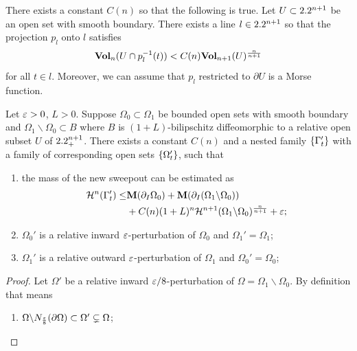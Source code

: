 \begin{theorem}[Falconer]\label{thm:falconer}
    There exists a constant $C(n)$ so that the following is true. Let $U \subset 2.2^{n + 1}$ be an open set with smooth boundary. There exists a line $l \in 2.2^{n + 1}$ so that the projection $p_l$ onto $l$ satisfies
    \begin{equation*}
        \mathbf{Vol}_n(U\cap p^{-1}_l(t)) < C(n)\mathbf{Vol}_{n + 1}(U)^{\frac{n}{n + 1}}
    \end{equation*}
    for all $t \in l$. Moreover, we can assume that $p_l$ restricted to $\partial U$ is a Morse function.
\end{theorem}
\begin{lemma}\label{lem:existence-nested-between-sets}
    Let $\varepsilon > 0$, $L > 0$. Suppose $\Omega_0 \subset \Omega_1$ be bounded open sets with smooth boundary and $\Omega_1 \backslash \Omega_0 \subset B$ where $B$ is $(1 + L)$-bilipschitz diffeomorphic to a relative open subset $U$ of $2.2^{n + 1}_+$. There exists a constant $C(n)$ and a nested family $\left\{\Gamma_t'\right\}$ with a family of corresponding open sets $\left\{\Omega_t'\right\}$, such that
    \begin{enumerate}
        \item[(1)] the mass of the new sweepout can be estimated as
        \begin{equation*}
            \begin{split}
                \mathcal{H}^n(\Gamma_t') \leq& \mathbf{M}(\partial_I\Omega_0) + \mathbf{M}(\partial_I(\Omega_1\backslash\Omega_0))\\
                &+ C(n)(1 + L)^n\mathcal{H}^{n + 1}(\Omega_1\backslash\Omega_0)^{\frac{n}{n + 1}} + \varepsilon;
            \end{split}
        \end{equation*}
        \item[(2)] $\Omega_0'$ is a relative inward $\varepsilon$-perturbation of $\Omega_0$ and $\Omega_1' = \Omega_1$;
        \item[(2')] $\Omega_1'$ is a relative outward $\varepsilon$-perturbation of $\Omega_1$ and $\Omega_0' = \Omega_0$;
    \end{enumerate}
    \begin{proof}
        Let $\Omega'$ be a relative inward $\varepsilon/8$-perturbation of $\Omega = \Omega_1\backslash\Omega_0$. By definition that means
        \begin{enumerate}
            \item[(a)] $\Omega\backslash N_\frac{\varepsilon}{8}(\partial\Omega) \subset \Omega' \subsetneq \Omega$;

\end{enumerate}
\end{proof}
\end{lemma}
